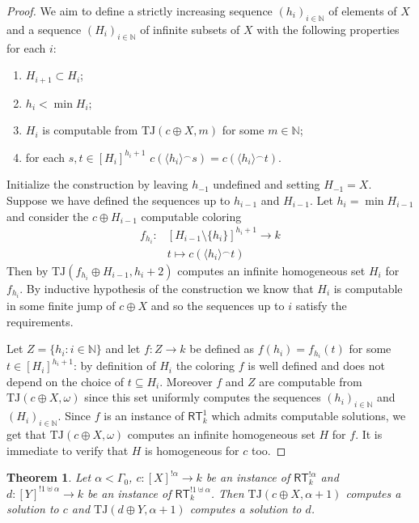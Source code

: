 \documentclass[11pt]{amsart}
\newtheorem{theorem}[thm]{Theorem}
\theoremstyle{definition}
\theoremstyle{remark}
\theoremstyle{plain}
\newcommand{\numberset}{\mathbb}
\newcommand{\N}{\numberset{N}}
\def\om{\omega}
\def\a{\alpha}
\def\G{\Gamma}
\def\conc{{}^\smallfrown}
\newcommand{\RT}{\mathsf{RT}}
\newcommand{\TJ}{\mathsf{TJ}}
\def\TJ{{\textrm{TJ}}}
\def\N{{\mathbb{N}}}
\begin{document}
\begin{proof}
We aim to define a strictly increasing sequence $(h_i)_{i \in \N}$ of elements of $X$ and a sequence $(H_i)_{i \in \N}$ of infinite subsets of $X$ with the following properties for each $i$:
\begin{enumerate}
    \item $H_{i+1} \subset H_i$;
    \item $h_i < \min H_i$;
    \item $H_i$ is computable from $\TJ(c \oplus X,m)$ for some $m \in \N$;
    \item for each $s,t \in [H_i]^{h_i+1}$ $c(\langle h_i \rangle \conc s) = c(\langle h_i \rangle \conc t)$.
\end{enumerate}

Initialize the construction by leaving $h_{-1}$ undefined and setting $H_{-1} = X$.
Suppose we have defined the sequences up to $h_{i-1}$ and $H_{i-1}$.
Let $h_i = \min H_{i-1}$ and consider the $c \oplus H_{i-1}$ computable coloring
\begin{align*}
    f_{h_i} \colon & [H_{i-1} \setminus \{h_i\}]^{h_i+1} \to k \\
     & t \mapsto c(\langle h_i \rangle \conc t)
\end{align*}
Then by \cite{jockusch} $\TJ(f_{h_i} \oplus H_{i-1},h_i+2)$ computes an infinite homogeneous set $H_i$ for $f_{h_i}$.
By inductive hypothesis of the construction we know that $H_i$ is computable in some finite jump of $c \oplus X$ and so the sequences up to $i$ satisfy the requirements.

Let $Z = \{h_i : i \in \N \}$ and let $f \colon Z \to k$ be defined as $f(h_i) = f_{h_i} (t)$ for some $t \in [H_i]^{h_i+1}$: by definition of $H_i$ the coloring $f$ is well defined and does not depend on the choice of $t \subseteq H_i$.
Moreover $f$ and $Z$ are computable from $\TJ(c \oplus X,\om)$ since this set uniformly computes the sequences $(h_i)_{i \in \N}$ and $(H_i)_{i \in \N}$.
Since $f$ is an instance of $\RT^1_k$ which admits computable solutions, we get that $\TJ(c \oplus X,\om)$ computes an infinite homogeneous set $H$ for $f$.
It is immediate to verify that $H$ is homogeneous for $c$ too.
\end{proof}

\begin{theorem}\label{upper general case}
Let $\a < \G_0$, $c \colon [X]^{! \a} \to k$ be an instance of $\RT^{! \a}_k$ and $d \colon [Y]^{! 1 \uplus \a} \to k$ be an instance of $\RT^{! 1 \uplus \a}_k$.
Then $\TJ(c \oplus X,\a+1)$ computes a solution to $c$ and $\TJ(d \oplus Y,\a+1)$ computes a solution to $d$.
\end{theorem}
\end{document}
